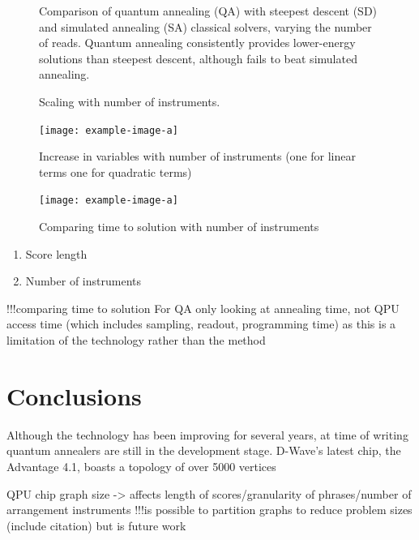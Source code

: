 \documentclass[12pt]{article}
\theoremstyle{definition}
\begin{document}
\begin{figure}
    \centering\small
    
    \caption{Comparison of quantum annealing (QA) with steepest descent (SD) and simulated annealing (SA) classical solvers, varying the number of reads. Quantum annealing consistently provides lower-energy solutions than steepest descent, although fails to beat simulated annealing.}
    \label{fig:entropy}
\end{figure}

\begin{figure}
    \centering\small
    
    \caption{Scaling with number of instruments.}
    \label{fig:energy-scaling}
\end{figure}

\begin{figure}
    \texttt{[image: example-image-a]}
    \caption{Increase in variables with number of instruments (one for linear terms one for quadratic terms)}
    \label{fig:qubit-scaling}
\end{figure}

\begin{figure}
    \texttt{[image: example-image-a]}
    \caption{Comparing time to solution with number of instruments}
    \label{fig:times}
\end{figure}


\begin{enumerate}
    \item Score length
    \item Number of instruments
\end{enumerate}

!!!comparing time to solution
For QA only looking at annealing time, not QPU access time (which includes sampling, readout, programming time) as this is a limitation of the technology rather than the method

\section{Conclusions}


Although the technology has been improving for several years, at time of writing quantum annealers are still in the development stage. D-Wave's latest chip, the Advantage 4.1, boasts a topology of over \num{5000} vertices

QPU chip graph size -> affects length of scores/granularity of phrases/number of arrangement instruments
!!!is possible to partition graphs to reduce problem sizes (include citation) but is future work
\end{document}

